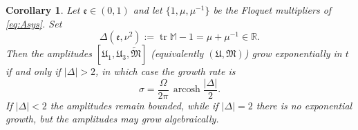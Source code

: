 \documentclass[10pt,a4paper]{amsart}
\newcommand{\A}{\boldsymbol{\mathfrak{U}}}              %
\newcommand{\B}{{\mathfrak{M}}}
\newcommand{\ee}{\mathfrak{e}}
\newcommand{\tr}{\operatorname{tr}}     %
\newcommand{\arcosh}{\operatorname{arcosh}} %
\newtheorem{corollary}[theorem]{Corollary}
\begin{document}
\setcounter{theorem}{7}
\setcounter{equation}{64}
\begin{corollary}\label{cor:discriminant}
Let $\ee\in(0,1)$ and let $\{1,\mu,\mu^{-1}\}$ be the Floquet multipliers of \eqref{eq:Asys}. Set
\begin{equation}\label{eq:Delta}
\Delta(\ee,\nu^2):=\tr\mathbb M-1=\mu+\mu^{-1}\in\mathbb R .
\end{equation}
Then the amplitudes $[\mathfrak{U}_1,\mathfrak{U}_3,\widetilde{\B}]$ (equivalently $(\A,\B)$) grow exponentially in $t$ if and only if $|\Delta|>2$, in which case the growth rate is
\begin{equation}\label{eq:sigma}
\sigma=\frac{\Omega}{2\pi}\,\arcosh\frac{|\Delta|}{2}.
\end{equation}
If $|\Delta|<2$ the amplitudes remain bounded, while if $|\Delta|=2$ there is no exponential growth, but the amplitudes may grow algebraically.
\end{corollary}

\setcounter{theorem}{10}
\setcounter{equation}{71}
\end{document}

